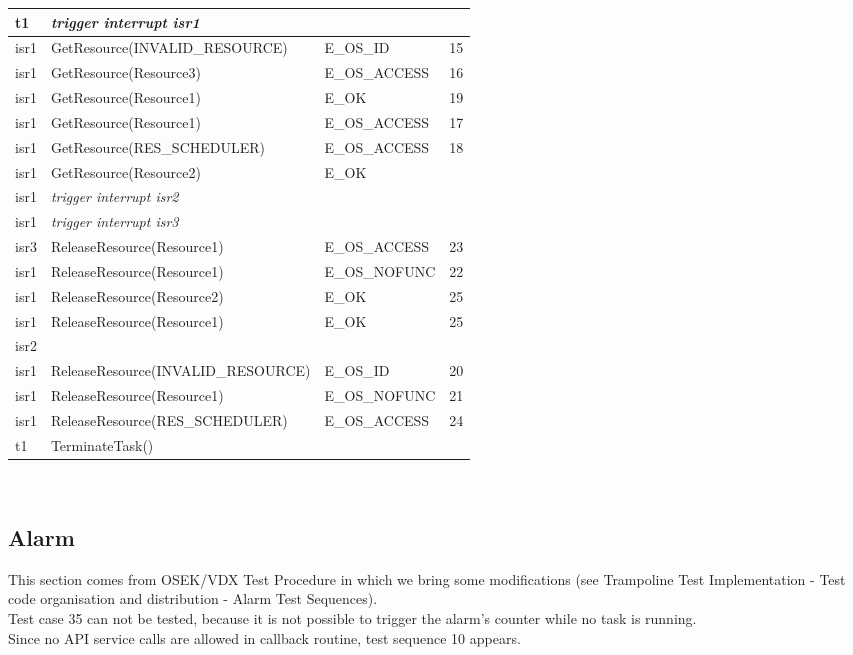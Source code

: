 \documentclass[10pt]{article}
\newlength{\Li}\settowidth{\Li}{Running}
\newlength{\Lii}\setlength{\Lii}{7cm}
\newlength{\Liiii}\setlength{\Liiii}{0.9cm}
\newlength{\Liii}\setlength{\Liii}{\textwidth} \addtolength{\Liii}{-\Li} \addtolength{\Liii}{-\Lii} \addtolength{\Liii}{-\Liiii}
\begin{document}
	\begin{supertabular}{|p{\Li}|p{\Lii}|p{\Liii}|p{\Liiii}|} \hline 
	t1 	& \textit{trigger interrupt isr1}				&  					& \\ \hline
	isr1 	& GetResource(INVALID\_RESOURCE)		& E\_OS\_ID 			& 15 \\ \hline
	isr1	& GetResource(Resource3) 				& E\_OS\_ACCESS		& 16 \\ \hline
	isr1 	& GetResource(Resource1) 				& E\_OK 				& 19 \\ \hline
	isr1 	& GetResource(Resource1) 				& E\_OS\_ACCESS		& 17 \\ \hline
	isr1 	& GetResource(RES\_SCHEDULER)		& E\_OS\_ACCESS		& 18 \\ \hline
	isr1 	& GetResource(Resource2) 				& E\_OK 				& \\ \hline
	
	isr1 	& \textit{trigger interrupt isr2}				&  					& \\ \hline
	isr1 	& \textit{trigger interrupt isr3}				&  					& \\ \hline
	isr3 	& ReleaseResource(Resource1) 			& E\_OS\_ACCESS 		& 23 \\ \hline

	isr1 	& ReleaseResource(Resource1) 			& E\_OS\_NOFUNC 		& 22 \\ \hline
	isr1 	& ReleaseResource(Resource2) 			& E\_OK		 		& 25 \\ \hline
	isr1 	& ReleaseResource(Resource1) 			& E\_OK		 		& 25 \\ \hline
	
	isr2	& 									& 					& \\ \hline
	
	isr1 	& ReleaseResource(INVALID\_RESOURCE)	& E\_OS\_ID		 	& 20 \\ \hline
	isr1 	& ReleaseResource(Resource1) 			& E\_OS\_NOFUNC 		& 21 \\ \hline
	isr1 	& ReleaseResource(RES\_SCHEDULER)	& E\_OS\_ACCESS 		& 24 \\ \hline
	
	t1 & TerminateTask() 						& 				&  \\ \hline
	\end{supertabular} \\

\subsection{Alarm}
This section comes from OSEK/VDX Test Procedure \cite{OSEK_Test_Procedure_20} in which we bring some modifications (see Trampoline Test Implementation \cite{TrampolineTestImplementation_10} - Test code organisation and distribution - Alarm Test Sequences).\\
Test case 35 can not be tested, because it is not possible to trigger the alarm’s counter while no task is running. \\
Since no API service calls are allowed in callback routine, test sequence 10 appears.\\
	
\end{document}
